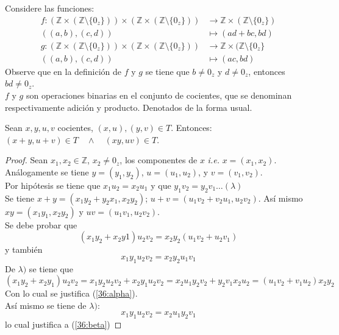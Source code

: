 Considere las funciones:
\begin{align*}
  f : (\mathbb{Z} \times (\mathbb{Z} \setminus\{0_z\}))\times(\mathbb{Z}
  \times (\mathbb{Z} \setminus\{0_z\})) &\rightarrow \mathbb{Z} \times
  (\mathbb{Z} \setminus\{0_z\}) \\
  ((a,b),(c,d)) &\mapsto (ad + bc, bd) \\
  g : (\mathbb{Z} \times (\mathbb{Z} \setminus\{0_z\}))\times(\mathbb{Z}
  \times (\mathbb{Z} \setminus\{0_z\})) &\rightarrow \mathbb{Z} \times
  (\mathbb{Z} \setminus \{0_z\}\\
  ((a,b),(c,d)) &\mapsto (ac,bd)
\end{align*}
Observe que en la definición de $f$ y $g$ se tiene que $b \neq 0_z$ y $d \neq
0_z$, entonces $bd \neq 0_z$.\\
$f$ y $g$ son operaciones binarias en el conjunto de cocientes, que se denominan
respectivamente adición y producto. Denotados de la forma usual.
\begin{lemma}\label{lemma:rat1} 
  Sean $x, y, u, v$ cocientes, $(x,u), (y,v)\in T$. Entonces: $(x+y, u+v)\in T
  \quad \land \quad (xy, uv)\in T$.
\end{lemma}
\begin{proof}
  Sean $x_1, x_2 \in \mathbb{Z}$, $x_2 \neq 0_z$, los componentes de $x$
  \textit{i.e.} $x=(x_1,x_2)$. Análogamente se tiene $y=(y_1,y_2)$,
  $u=(u_1,u_2)$, y $v=(v_1,v_2)$. \\
  Por hipótesis se tiene que $x_1u_2 = x_2u_1$ y que $ y_1v_2 = y_2v_1 \ldots
  (\lambda)$ \\
  Se tiene $x + y = (x_1y_2 +y_2x_1, x_2y_2)$; $u +v = (u_1v_2 + v_2 u_1, u_2
  v_2)$. Así mismo $xy = (x_1y_1, x_2y_2)$ y $uv = (u_1v_1, u_2v_2)$. \\
  Se debe probar que 
  \begin{equation}\label{36:alpha} 
    (x_1y_2 + x_2y1)u_2v_2 = x_2y_2 (u_1v_2 + u_2v_1) 
  \end{equation}
  y también
  \begin{equation}\label{36:beta}
    x_1y_1u_2v_2 = x_2y_2u_1v_1
  \end{equation}
  De $\lambda)$ se tiene que
  \[
    (x_1y_2 + x_2 y_1)u_2v_2 = x_1y_2u_2v_2 + x_2y_1u_2v_2 = x_2u_1y_2v_2 +
    y_2v_1x_2u_2 = (u_1v_2 + v_1u_2)x_2y_2
  \]
  Con lo cual se justifica (\ref{36:alpha}).\\
  Así mismo se tiene de $\lambda)$:
  \[
    x_1y_1u_2v_2 = x_2u_1y_2v_1
  \]
  lo cual justifica a (\ref{36:beta})
\end{proof}
